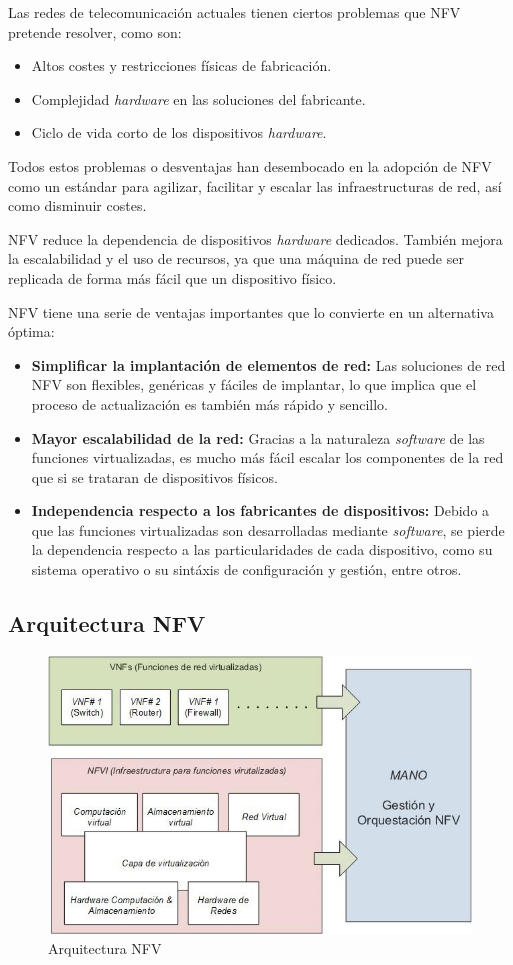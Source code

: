 Las redes de telecomunicación actuales tienen ciertos problemas que NFV pretende resolver, como son:

\begin{itemize}
	\item Altos costes y restricciones físicas de fabricación.
	\item Complejidad \textit{hardware} en las soluciones del fabricante.
	\item Ciclo de vida corto de los dispositivos \textit{hardware}.
\end{itemize}

Todos estos problemas o desventajas han desembocado en la adopción de NFV como un estándar para agilizar, facilitar y escalar las infraestructuras de red, así como disminuir costes.

NFV reduce la dependencia de dispositivos \textit{hardware} dedicados. También mejora la escalabilidad y el uso de recursos, ya que una máquina de red puede ser replicada de forma más fácil que un dispositivo físico.

NFV tiene una serie de ventajas importantes que lo convierte en un alternativa óptima:

\begin{itemize}
	\item \textbf{Simplificar la implantación de elementos de red:} Las soluciones de red NFV son flexibles, genéricas y fáciles de implantar, lo que implica que el proceso de actualización es también más rápido y sencillo.
	
	\item \textbf{Mayor escalabilidad de la red:} Gracias a la naturaleza \textit{software} de las funciones virtualizadas, es mucho más fácil escalar los componentes de la red que si se trataran de dispositivos físicos.
	
	\item \textbf{Independencia respecto a los fabricantes de dispositivos:} Debido a que las funciones virtualizadas son desarrolladas mediante \textit{software}, se pierde la dependencia respecto a las particularidades de cada dispositivo, como su sistema operativo o su sintáxis de configuración y gestión, entre otros.
\end{itemize}

\subsection{Arquitectura NFV}
\label{subsec:nfvarq}

\begin{figure}[!ht]
	\centering
	\includegraphics[width=0.75\linewidth]{imagenes/arquitectura_nfv}
	\caption{Arquitectura NFV}
	\label{fig:arquitecturanfv}
\end{figure}


\cleardoublepage